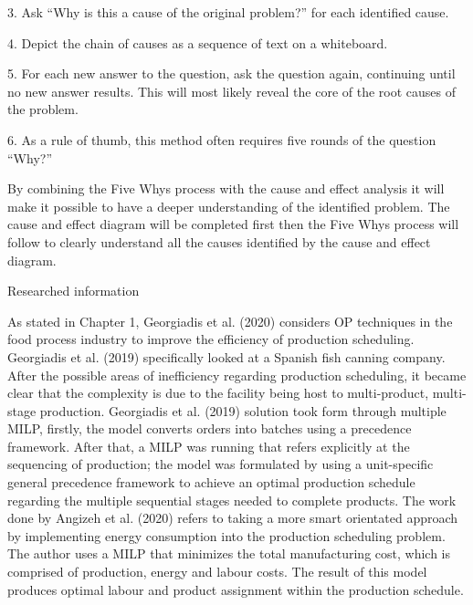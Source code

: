 \documentclass[a4paper,11pt,fleqn]{report}
\begin{document}
                3. Ask “Why is this a cause of the original problem?” for each identified cause.
                
                4. Depict the chain of causes as a sequence of text on a whiteboard.
                
                5. For each new answer to the question, ask the question again, continuing until no new answer results. This will most likely reveal the core of the root causes of the problem.
                
                6. As a rule of thumb, this method often requires five rounds of the question “Why?” 
                
                By combining the Five Whys process with the cause and effect analysis it will make it possible to have a deeper understanding of the identified problem. The cause and effect diagram will be completed first then the Five Whys process will follow to clearly understand all the causes identified by the cause and effect diagram.
                
            Researched information
            
                As stated in Chapter 1, Georgiadis et al. (2020) considers OP techniques in the food process industry to improve the efficiency of production scheduling. Georgiadis et al. (2019) specifically looked at a Spanish fish canning company. After the possible areas of inefficiency regarding production scheduling, it became clear that the complexity is due to the facility being host to multi-product, multi-stage production. Georgiadis et al. (2019) solution took form through multiple MILP, firstly, the model converts orders into batches using a precedence framework. After that, a MILP was running that refers explicitly at the sequencing of production; the model was formulated by using a unit-specific general precedence framework to achieve an optimal production schedule regarding the multiple sequential stages needed to complete products.
                The work done by Angizeh et al. (2020) refers to taking a more smart orientated approach by implementing energy consumption into the production scheduling problem. The author uses a MILP that minimizes the total manufacturing cost, which is comprised of production, energy and labour costs. The result of this model produces optimal labour and product assignment within the production schedule.
\end{document}
